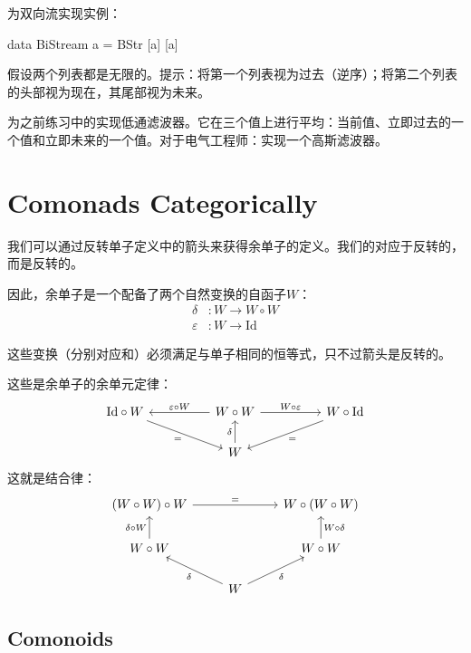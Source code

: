 \documentclass[DaoFP]{subfiles}
\begin{document}
    \begin{exercise}
        为双向流实现实例：
        \begin{haskell}
            data BiStream a = BStr [a] [a]
        \end{haskell}
        假设两个列表都是无限的。提示：将第一个列表视为过去（逆序）；将第二个列表的头部视为现在，其尾部视为未来。
    \end{exercise}

    \begin{exercise}
        为之前练习中的实现低通滤波器。它在三个值上进行平均：当前值、立即过去的一个值和立即未来的一个值。对于电气工程师：实现一个高斯滤波器。
    \end{exercise}

    \section{Comonads Categorically}

    我们可以通过反转单子定义中的箭头来获得余单子的定义。我们的对应于反转的，而是反转的。

    因此，余单子是一个配备了两个自然变换的自函子$W$：
\begin{align*}
\delta &\colon W \to W \circ W \\
\varepsilon &\colon W \to \text{Id}
\end{align*}

这些变换（分别对应和）必须满足与单子相同的恒等式，只不过箭头是反转的。

这些是余单子的余单元定律：
\[
\begin{tikzcd}
\text{Id} \circ W
\arrow[rrd, "="']
& & W \circ W
\arrow[ll, "\varepsilon \circ W"']
\arrow[rr, "W \circ \varepsilon"]
&& W \circ \text{Id}
\arrow[lld, "="]
\\
&& W
\arrow[u, "\delta"]
\end{tikzcd}
\]
这就是结合律：
\[
\begin{tikzcd}
(W \circ W) \circ W
\arrow[rr, "="]
&&
W \circ (W \circ W)
\\
W \circ W
\arrow[u, "\delta \circ W"]
& & W \circ W
\arrow[u, "W \circ \delta"']
\\
&  W
\arrow[ul, "\delta"]
\arrow[ur, "\delta"']
\end{tikzcd}
\]

\subsection{Comonoids}
\end{document}
